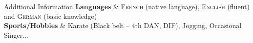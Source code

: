%
%
%

\begin{rubriquetableau}[\offsetintab]{Additional Information}
    \textbf{Languages}
    & \textsc{French} (native language), \textsc{English}
    (fluent) and \textsc{German} (basic knowledge)
    \\
    \textbf{Sports/Hobbies}
    & Karate (Black belt -- {\small 4th DAN}, \acf{DIF}), Jogging, Occasional Singer...
    \\
\end{rubriquetableau}

%
